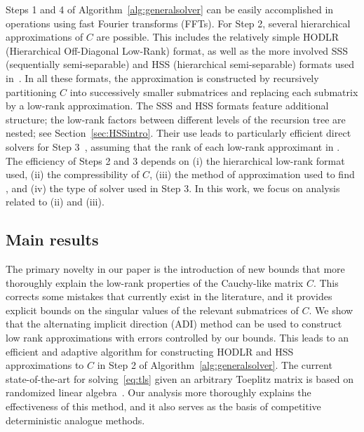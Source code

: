 \documentclass[final,reqno,onefignum,onetabnum]{siamart190516}
\begin{document}
Steps 1 and 4 of Algorithm~\ref{alg:generalsolver} can be easily accomplished in  operations using fast Fourier transforms (FFTs). 
 For Step 2, several hierarchical approximations of $C$ are possible. This includes the relatively simple HODLR (Hierarchical Off-Diagonal Low-Rank) format, as well as the more involved SSS (sequentially semi-separable) and HSS (hierarchical semi-separable) formats used in~\cite{chandrasekaran2007superfast,martinsson2011fast, xia2012superfast}.
 In all these formats, the approximation  is constructed by recursively partitioning $C$ into successively smaller submatrices and replacing each submatrix by a low-rank approximation. The SSS and HSS formats feature additional structure; the low-rank factors between different levels of the recursion tree are nested; see Section~\ref{sec:HSSintro}. 
Their use leads to particularly efficient  direct solvers for Step 3~\cite{chandrasekaran2006fast,xia2012superfast}, 
assuming that the rank of each low-rank approximant in .
The efficiency of Steps 2 and 3 depends on (i) the hierarchical low-rank format used, (ii) the compressibility of $C$,  (iii) the method of approximation used to find  , and (iv) the type of solver used in Step 3. 
In this work, we focus on analysis related to (ii) and (iii).  

\subsection{Main results}

The primary novelty in our paper is the introduction of new bounds that more thoroughly explain the low-rank properties of the Cauchy-like matrix $C$. This corrects some mistakes  that currently exist in the literature, and it provides explicit bounds on the singular values of the relevant submatrices of $C$. We show that the alternating implicit direction (ADI) method can be used to construct low rank approximations with errors controlled by our bounds. This leads to an efficient and adaptive algorithm for constructing HODLR and HSS approximations to $C$ in Step 2 of Algorithm~\ref{alg:generalsolver}. 
The current state-of-the-art for solving~\eqref{eq:tls} given an arbitrary Toeplitz matrix is based on randomized linear algebra~\cite{xia2012superfast}. Our analysis more thoroughly explains the effectiveness of this method, and it also serves as the basis of competitive deterministic analogue methods. 
\end{document}
